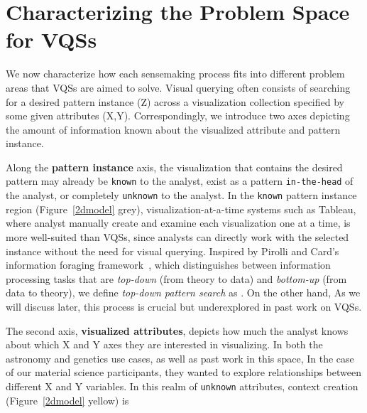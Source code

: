 \section{Characterizing the Problem Space for VQSs}
We now characterize how each sensemaking process fits into different problem areas that VQSs are aimed to solve. Visual querying often consists of searching for a desired pattern instance (Z) across a visualization collection specified by some given attributes (X,Y). Correspondingly, we introduce two axes depicting the amount of information known about the visualized attribute and pattern instance.
\par Along the \textbf{pattern instance} axis, the visualization that contains the desired pattern may already be \texttt{known} to the analyst, exist as a pattern \texttt{in-the-head} of the analyst, or  completely \texttt{unknown} to the analyst. In the \texttt{known} pattern instance region (Figure~\ref{2dmodel} grey), visualization-at-a-time systems such as Tableau, where analyst manually create and examine each visualization one at a time, is more well-suited than VQSs, since analysts can directly work with the selected instance without the need for visual querying. Inspired by Pirolli and Card's information foraging framework~\cite{Pirolli}, which distinguishes between information processing tasks that are \textit{top-down} (from theory to data) and \textit{bottom-up} (from data to theory), we define \textit{top-down pattern search} as . On the other hand,  As we will discuss later, this process is crucial but underexplored in past work on VQSs.
\par The second axis, \textbf{visualized attributes},
depicts how much the analyst
knows about which X and Y axes
they are interested in visualizing.
In both the astronomy and genetics use cases,
as well as past work in this space,  In the case of our material science participants, they wanted to explore relationships between different
X and Y variables. In this realm of \texttt{unknown} attributes, context creation (Figure~\ref{2dmodel} yellow) is
